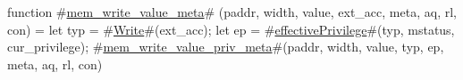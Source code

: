 function #\hyperref[sailRISCVzmemzywritezyvaluezymeta]{mem\_write\_value\_meta}# (paddr, width, value, ext_acc, meta, aq, rl, con) = {
  let typ = #\hyperref[sailRISCVzWrite]{Write}#(ext_acc);
  let ep = #\hyperref[sailRISCVzeffectivePrivilege]{effectivePrivilege}#(typ, mstatus, cur_privilege);
  #\hyperref[sailRISCVzmemzywritezyvaluezyprivzymeta]{mem\_write\_value\_priv\_meta}#(paddr, width, value, typ, ep, meta, aq, rl, con)
}
